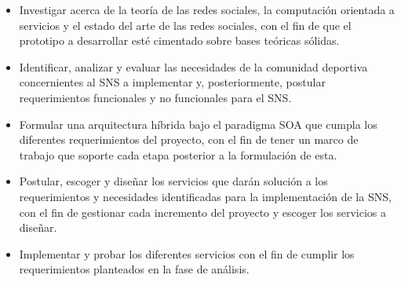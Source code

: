 \begin{itemize}
  \item Investigar acerca de la teoría de las redes sociales, la computación orientada a servicios y el estado del arte de las redes sociales, con el fin de que el prototipo a desarrollar esté cimentado sobre bases teóricas sólidas.
  \item Identificar, analizar y evaluar las necesidades de la comunidad deportiva concernientes al SNS a implementar y, posteriormente, postular requerimientos funcionales y no funcionales para el SNS.
  \item Formular una arquitectura híbrida bajo el paradigma SOA que cumpla los diferentes requerimientos del proyecto, con el fin de tener un marco de trabajo que soporte cada etapa posterior a la formulación de esta.
  \item Postular, escoger y diseñar los servicios que darán solución a los requerimientos y necesidades identificadas para la implementación de la SNS, con el fin de gestionar cada incremento del proyecto y escoger los servicios a diseñar.
  \item Implementar y probar los diferentes servicios con el fin de cumplir los requerimientos planteados en la fase de análisis.
\end{itemize}
